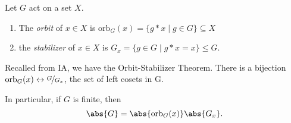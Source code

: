 \begin{definition}{}{}
    Let \(G\) act on a set \(X\).
    \begin{enumerate}
        \item The \textit{orbit} of \(x\in X\) is \(\mathrm{orb}_G(x) = \{g*x \mid g \in G\}\subseteq X\) 
        \item the \textit{stabilizer} of \(x \in X\) is \(G_x = \{g \in G \mid g * x = x\} \leq G\).
    \end{enumerate}
\end{definition}
Recalled from IA, we have the Orbit-Stabilizer Theorem.
There is a bijection \(\mathrm{orb}_G(x) \leftrightarrow \nicefrac{G}{G_x}\), the set of left cosets in G.

In particular, if \(G\) is finite, then
\[
    \abs{G} = \abs{\mathrm{orb}_G(x)} \abs{G_x}.
\]

